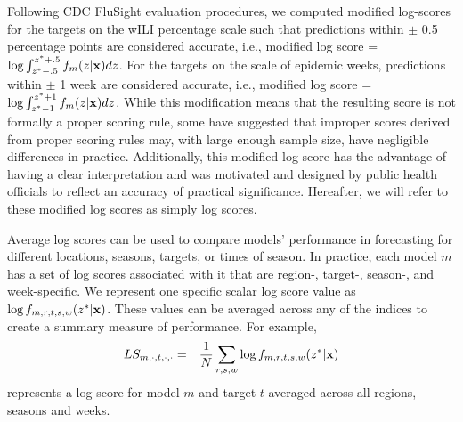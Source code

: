 \documentclass{article}\usepackage[]{graphicx}\usepackage[]{color}
\begin{document}
Following CDC FluSight evaluation procedures, we computed modified log-scores for the targets on the wILI percentage scale such that predictions within $\pm$ 0.5 percentage points are considered accurate, i.e., modified log score = $\log \int_{z^* -.5}^{z^* + .5} f_m(z|{\bf{x}})dz$. 
For the targets on the scale of epidemic weeks, predictions within $\pm$ 1 week are considered accurate, i.e., modified log score = $\log \int_{z^* -1}^{z^* + 1} f_m(z|{\bf{x}})dz$. 
While this modification means that the resulting score is not formally a proper scoring rule, some have suggested that improper scores derived from proper scoring rules may, with large enough sample size, have negligible differences in practice.\cite{Gneiting2007} %
Additionally, this modified log score has the advantage of having a clear interpretation and was  motivated and designed by public health officials to reflect an accuracy of practical significance.
Hereafter, we will refer to these modified log scores as simply log scores.

Average log scores can be used to compare models' performance in forecasting for different locations, seasons, targets, or times of season.
In practice, each model $m$ has a set of log scores associated with it that are region-, target-, season-, and week-specific.
We represent one specific scalar log score value as $\log f_{m,r,t,s,w}(z^*|\bf{x})$. 
These values can be averaged across any of the indices to create a summary measure of performance.
For example,
\begin{eqnarray}
LS_{m,\cdot,t,\cdot,\cdot} & = & \frac{1}{N} \sum_{r,s,w} \log f_{m,r,t,s,w}(z^*|{\bf x}) \label{eqn:logscore}
\end{eqnarray}
represents a log score for model $m$ and target $t$ averaged across all regions, seasons and weeks.
\end{document}

